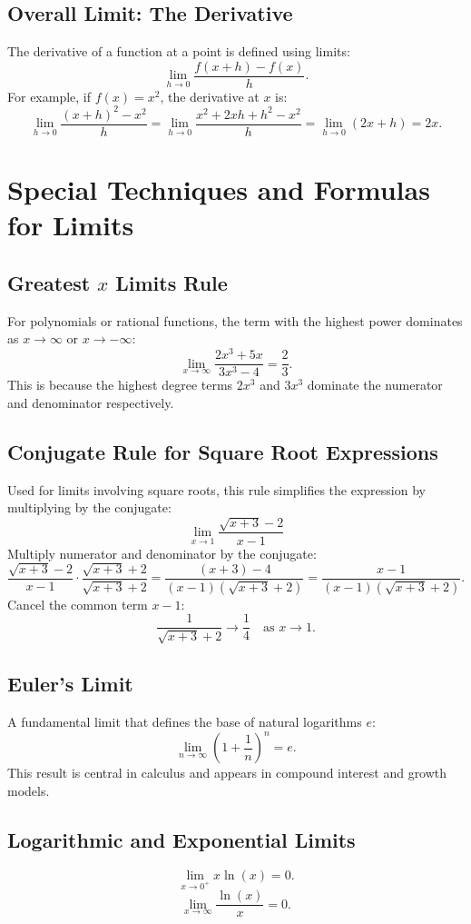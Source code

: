 \documentclass[12pt,a4paper]{article}
\begin{document}
\subsection{Overall Limit: The Derivative}
The derivative of a function at a point is defined using limits:
\[
\lim_{h \to 0} \frac{f(x+h) - f(x)}{h}.
\]
For example, if $f(x) = x^2$, the derivative at $x$ is:
\[
\lim_{h \to 0} \frac{(x+h)^2 - x^2}{h} = \lim_{h \to 0} \frac{x^2 + 2xh + h^2 - x^2}{h} = \lim_{h \to 0} (2x + h) = 2x.
\]

\section{Special Techniques and Formulas for Limits}

\subsection{Greatest $x$ Limits Rule}
For polynomials or rational functions, the term with the highest power dominates as $x \to \infty$ or $x \to -\infty$:
\[
\lim_{x \to \infty} \frac{2x^3 + 5x}{3x^3 - 4} = \frac{2}{3}.
\]
This is because the highest degree terms $2x^3$ and $3x^3$ dominate the numerator and denominator respectively.

\subsection{Conjugate Rule for Square Root Expressions}
Used for limits involving square roots, this rule simplifies the expression by multiplying by the conjugate:
\[
\lim_{x \to 1} \frac{\sqrt{x+3} - 2}{x-1}
\]
Multiply numerator and denominator by the conjugate:
\[
\frac{\sqrt{x+3} - 2}{x-1} \cdot \frac{\sqrt{x+3} + 2}{\sqrt{x+3} + 2} = \frac{(x+3) - 4}{(x-1)(\sqrt{x+3} + 2)} = \frac{x-1}{(x-1)(\sqrt{x+3} + 2)}.
\]
Cancel the common term $x-1$:
\[
\frac{1}{\sqrt{x+3} + 2} \to \frac{1}{4} \quad \text{as } x \to 1.
\]

\subsection{Euler's Limit}
A fundamental limit that defines the base of natural logarithms $e$:
\[
\lim_{n \to \infty} \left(1 + \frac{1}{n}\right)^n = e.
\]
This result is central in calculus and appears in compound interest and growth models.

\subsection{Logarithmic and Exponential Limits}
\[
\lim_{x \to 0^+} x \ln(x) = 0.
\]
\[
\lim_{x \to \infty} \frac{\ln(x)}{x} = 0.
\]
\end{document}
